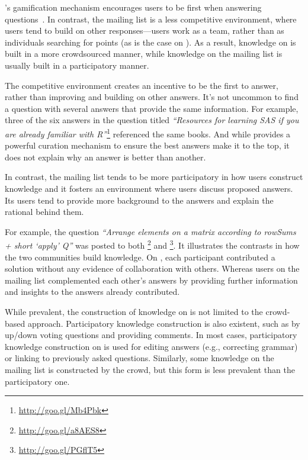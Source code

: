 \SO's gamification mechanism encourages users to be first when answering questions~\cite{Singer2013}. In contrast, the \RH mailing list is a less competitive environment, where users tend to build on other responses---\RH users work as a team, rather than as individuals searching for points (as is the case on \SO).
As a result, knowledge on \SO is built in a more crowdsourced manner, while knowledge on the \RH mailing list is usually built in a participatory manner.

The competitive \SO environment creates an incentive to be the first to answer, rather than improving and building on other answers. It's not uncommon to find a question with several answers that provide the same information. For example, three of the six answers in the \SO question titled \textit{``Resources for learning SAS if you are already familiar with R''}\footnote{\url{http://goo.gl/Mb4Pbk}} referenced the same books.
And while \SO provides a powerful curation mechanism to ensure the best answers make it to the top, it does not explain why an answer is better than another.

In contrast, the \RH mailing list tends to be more participatory in how users construct knowledge and it fosters an environment where users discuss proposed answers. Its users tend to provide more background to the answers and explain the rational behind them.

For example, the question \textit{``Arrange elements on a matrix according to rowSums + short `apply' Q''} was posted to both \SO\footnote{\url{http://goo.gl/a8AES8}} and {\RH}\footnote{\url{http://goo.gl/PGflT5}}. It illustrates the contrasts in how the two communities build knowledge.
On \SO, each participant contributed a solution without any evidence of collaboration with others.
Whereas users on the \RH mailing list complemented each other's answers by providing further information and insights to the answers already contributed.
    
While prevalent, the construction of knowledge on \SO is not limited to the crowd-based approach. Participatory knowledge construction is also existent, such as by up/down voting questions and providing comments. In most cases, participatory knowledge construction on \SO is used for editing answers (e.g., correcting grammar) or linking to previously asked questions.
Similarly, some knowledge on the \RH mailing list is constructed by the crowd, but this form is less prevalent than the participatory one.

